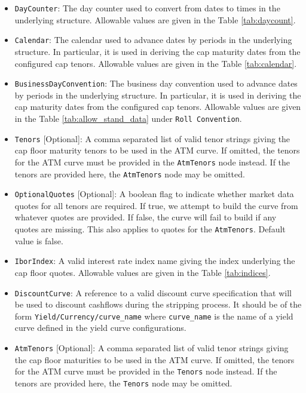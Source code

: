 \begin{itemize}
\item \lstinline!DayCounter!:
The day counter used to convert from dates to times in the underlying structure. Allowable values are given in the Table \ref{tab:daycount}.

\item \lstinline!Calendar!:
The calendar used to advance dates by periods in the underlying structure. In particular, it is used in deriving the cap maturity dates from the configured cap tenors. Allowable values are given in the Table \ref{tab:calendar}.

\item \lstinline!BusinessDayConvention!:
The business day convention used to advance dates by periods in the underlying structure. In particular, it is used in deriving the cap maturity dates from the configured cap tenors. Allowable values are given in the Table \ref{tab:allow_stand_data} under \lstinline!Roll Convention!.

\item \lstinline!Tenors! [Optional]:
A comma separated list of valid tenor strings giving the cap floor maturity tenors to be used in the ATM curve. If omitted, the tenors for the ATM curve must be provided in the \lstinline!AtmTenors! node instead. If the tenors are provided here, the \lstinline!AtmTenors! node may be omitted.

\item \lstinline!OptionalQuotes! [Optional]:
A boolean flag to indicate whether market data quotes for all tenors are required. If true, we attempt to build the curve from whatever quotes are provided. If false, the curve will fail to build if any quotes are missing. This also applies to quotes for the \lstinline!AtmTenors!. Default value is false.

\item \lstinline!IborIndex!:
A valid interest rate index name giving the index underlying the cap floor quotes. Allowable values are given in the Table \ref{tab:indices}.

\item \lstinline!DiscountCurve!:
A reference to a valid discount curve specification that will be used to discount cashflows during the stripping process. It should be of the form \lstinline!Yield/Currency/curve_name! where \lstinline!curve_name! is the name of a yield curve defined in the yield curve configurations.

\item \lstinline!AtmTenors! [Optional]:
A comma separated list of valid tenor strings giving the cap floor maturities to be used in the ATM curve. If omitted, the tenors for the ATM curve must be provided in the \lstinline!Tenors! node instead. If the tenors are provided here, the \lstinline!Tenors! node may be omitted.


\end{itemize}

